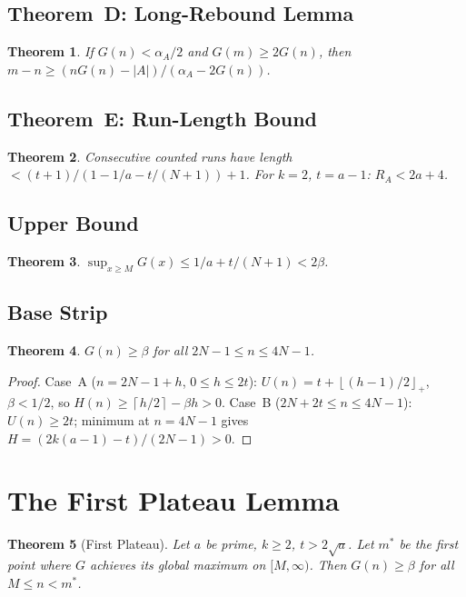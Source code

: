 \documentclass[11pt,a4paper]{article}
\newtheorem{theorem}{Theorem}[section]
\theoremstyle{definition}
\newcommand{\floor}[1]{\left\lfloor #1 \right\rfloor}
\newcommand{\ceil}[1]{\left\lceil #1 \right\rceil}
\begin{document}
\subsection{Theorem~D: Long-Rebound Lemma}

\begin{theorem}\label{thm:rebound}
If $G(n) < \alpha_A/2$ and $G(m) \geq 2G(n)$, then
$m - n \geq (nG(n) - |A|)/(\alpha_A - 2G(n))$.
\end{theorem}

\subsection{Theorem~E: Run-Length Bound}

\begin{theorem}\label{thm:runlength}
Consecutive counted runs have length $< (t+1)/(1 - 1/a - t/(N+1)) + 1$.
For $k=2$, $t=a-1$: $R_A < 2a+4$.
\end{theorem}

\subsection{Upper Bound}

\begin{theorem}\label{thm:upper}
$\sup_{x \geq M} G(x) \leq 1/a + t/(N+1) < 2\beta$.
\end{theorem}

\subsection{Base Strip}

\begin{theorem}\label{thm:base}
$G(n) \geq \beta$ for all $2N-1 \leq n \leq 4N-1$.
\end{theorem}

\begin{proof}
Case~A ($n = 2N-1+h$, $0 \leq h \leq 2t$): $U(n) = t + \floor{(h-1)/2}_+$,
$\beta < 1/2$, so $H(n) \geq \ceil{h/2} - \beta h > 0$.
Case~B ($2N+2t \leq n \leq 4N-1$): $U(n) \geq 2t$; minimum at $n = 4N-1$
gives $H = (2k(a-1)-t)/(2N-1) > 0$.
\end{proof}

\section{The First Plateau Lemma}

\begin{theorem}[First Plateau]\label{thm:plateau}
Let $a$ be prime, $k \geq 2$, $t > 2\sqrt{a}$. Let $m^*$ be the first
point where $G$ achieves its global maximum on $[M, \infty)$. Then
$G(n) \geq \beta$ for all $M \leq n < m^*$.
\end{theorem}
\end{document}
